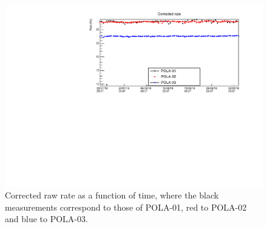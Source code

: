 \documentclass[12pt,a4paper]{amsart}
\begin{document}
\begin{figure}
\centering
\includegraphics[width = \textwidth]{../data/plots/CorrectedRate_all.pdf}
\caption{Corrected raw rate as a function of time, where the black measurements correspond to those of POLA-01, red to POLA-02 and blue to POLA-03.}
\label{fig:CorrectedRate}
\end{figure}


\printbibliography
\end{document}
